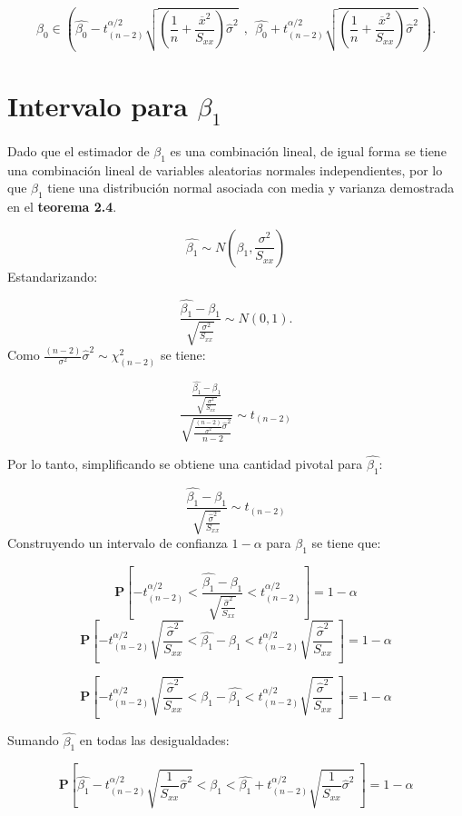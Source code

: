 \documentclass[
  a4paper,
  oneside,
  openany]{book}
\begin{document}
\[\beta_{0} \in \left( \hat{\beta_{0}}-t^{\alpha/2}_{(n-2)}\sqrt{\left(\frac{1}{n}+\frac{\overline{x}^2}{S_{xx}}\right)\hat{\sigma}^2} \ \ , \ \ \hat{\beta_{0}}+t^{\alpha/2}_{(n-2)}\sqrt{\left(\frac{1}{n}+\frac{\overline{x}^2}{S_{xx}}\right)\hat{\sigma}^2} \  \right).\]

\hypertarget{intervalo-para-beta_1}{%
\section{\texorpdfstring{Intervalo para \(\beta_{1}\)}{Intervalo para \textbackslash beta\_\{1\}}}\label{intervalo-para-beta_1}}

Dado que el estimador de \(\beta_{1}\) es una combinación lineal, de igual forma se tiene una combinación lineal de variables aleatorias normales independientes, por lo que \(\beta_{1}\) tiene una distribución normal asociada con media y varianza demostrada en el \textbf{teorema 2.4}.

\[\hat{\beta_{1}}\sim N \left(\beta_{1},\frac{\sigma^2}{S_{xx}}\right)\]
Estandarizando:

\[\frac{\hat{\beta_{1}}-\beta_{1}}{\sqrt{\frac{\sigma^2}{S_{xx}}}}\sim N(0,1).\]
Como \(\frac{(n-2)}{\sigma^2}\hat{\sigma}^2\sim\chi^2_{(n-2)}\) se tiene:

\[\frac{\frac{\hat{\beta_{1}}-\beta_{1}}{\sqrt{\frac{\sigma^2}{S_{xx}}}}}{\sqrt{\frac{\frac{(n-2)}{\sigma^2}\hat{\sigma}^2}{n-2}}} \sim t_{(n-2)}\]

Por lo tanto, simplificando se obtiene una cantidad pivotal para \(\hat{\beta_{1}}:\)

\[\frac{\hat{\beta_{1}}-\beta_{1}}{\sqrt{\frac{\hat{\sigma}^2}{S_{xx}}}}\sim t_{(n-2)}\]
Construyendo un intervalo de confianza \(1-\alpha\) para \(\beta_{1}\) se tiene que:

\[\mathbf{P}\left[-t^{\alpha/2}_{(n-2)} < \frac{\hat{\beta_{1}}-\beta_{1}}{\sqrt{\frac{\hat{\sigma}^2}{S_{xx}}}} < t^{\alpha/2}_{(n-2)}\right]=1-\alpha\]
\[\mathbf{P}\left[-t^{\alpha/2}_{(n-2)} \sqrt{\frac{\hat{\sigma}^2}{S_{xx}}} < \hat{\beta_{1}}-\beta_{1}< t^{\alpha/2}_{(n-2)} \sqrt{\frac{\hat{\sigma}^2}{S_{xx}}} \ \right]=1-\alpha\]

\[\mathbf{P}\left[-t^{\alpha/2}_{(n-2)} \sqrt{\frac{\hat{\sigma}^2}{S_{xx}}} < \beta_{1}-\hat{\beta_{1}}< t^{\alpha/2}_{(n-2)} \sqrt{\frac{\hat{\sigma}^2}{S_{xx}}} \ \right]=1-\alpha\]

Sumando \(\hat{\beta_{1}}\) en todas las desigualdades:

\[\mathbf{P}\left[\hat{\beta_{1}}-t^{\alpha/2}_{(n-2)} \sqrt{\frac{1}{S_{xx}}\hat{\sigma}^2} < \beta_{1}< \hat{\beta_{1}}+t^{\alpha/2}_{(n-2)} \sqrt{\frac{1}{S_{xx}}\hat{\sigma}^2} \ \right]=1-\alpha\]
\end{document}
